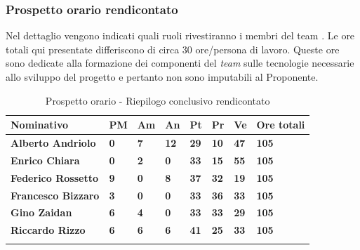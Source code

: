 \subsubsection{Prospetto orario rendicontato}
Nel dettaglio vengono indicati quali ruoli rivestiranno i membri del team 
\GRUPPO. Le ore totali qui presentate differiscono di circa 30 ore/persona di lavoro. 
Queste ore sono dedicate alla formazione dei componenti del \textit{team} sulle tecnologie
necessarie allo sviluppo del progetto e pertanto non sono imputabili al Proponente.
\begin{center}
	\def\arraystretch{1.6}
	\bgroup
	\begin{longtable}{| p{4cm} | p{1cm} | p{1cm} | p{1cm} | p{1cm}| p{1cm} | 
			p{1cm} | p{1.7cm}|}
		\hline
		\textbf{Nominativo} & \textbf{PM} & \textbf{Am} & \textbf{An} & 
		\textbf{Pt} & \textbf{Pr} & \textbf{Ve} & \textbf{Ore totali}\\ 
		
		\hline \hline  
		
		\textbf{Alberto Andriolo} & \textbf{0} & \textbf{7} & \textbf{12} & 
		\textbf{29} & \textbf{10} & \textbf{47} & \textbf{105}\\ 
		\hline 
		
		\textbf{Enrico Chiara} & \textbf{0} & \textbf{2} & \textbf{0} & 
		\textbf{33} & \textbf{15} & \textbf{55} & \textbf{105}\\ 
		\hline 
		
		\textbf{Federico Rossetto} & \textbf{9} & \textbf{0} & \textbf{8} & 
		\textbf{37} & \textbf{32} & \textbf{19} & \textbf{105}\\ 
		\hline 
		
		\textbf{Francesco Bizzaro} & \textbf{3} & \textbf{0} & \textbf{0} & 
		\textbf{33} & \textbf{36} & \textbf{33} & \textbf{105}\\ 
		\hline 
		
		\textbf{Gino Zaidan} & \textbf{6} & \textbf{4} & \textbf{0} & 
		\textbf{33} & \textbf{33} & \textbf{29} & \textbf{105}\\ 
		\hline 
		
		\textbf{Riccardo Rizzo} & \textbf{6} & \textbf{6} & \textbf{6} & 
		\textbf{41} & \textbf{25} & \textbf{33} & \textbf{105}\\ 
		\hline 
		
		\hline 
		
		\caption{Prospetto orario - Riepilogo conclusivo rendicontato}
	\end{longtable}
	\egroup
\end{center}
